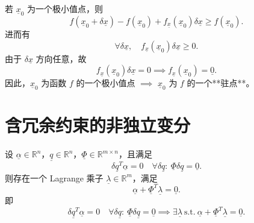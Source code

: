 若 \( \underline{x}_0 \) 为一个极小值点，则
\[
f(\underline{x}_0 + \delta \underline{x}) - f(\underline{x}_0) + f_{\underline{x}}(\underline{x}_0) \delta \underline{x} \geq f(\underline{x}_0).
\]
进而有
\[
\forall \delta \underline{x}, \quad f_{\underline{x}}(\underline{x}_0) \delta \underline{x} \geq 0.
\]
由于 \( \delta \underline{x} \) 方向任意，故
\[
f_{\underline{x}}(\underline{x}_0) \delta \underline{x} = 0 \implies f_{\underline{x}}(\underline{x}_0) = \underline{0}.
\]
因此，\( \underline{x}_0 \) 为函数 \( f \) 的一个极小值点 \( \implies \) \( \underline{x}_0 \) 为 \( f \) 的一个**驻点**。

\section{含冗余约束的非独立变分}
设 \( \underline{\alpha} \in \mathbb{R}^n \)，\( \underline{q} \in \mathbb{R}^n \)，\( \underline{\Phi} \in \mathbb{R}^{m \times n} \)，且满足
\[
\delta \underline{q}^T \underline{\alpha} = 0 \quad \forall \delta \underline{q}: \ \underline{\Phi} \delta \underline{q} = \underline{0}.
\]
则存在一个 Lagrange 乘子 \( \underline{\lambda} \in \mathbb{R}^m \)，满足
\[
\underline{\alpha} + \underline{\Phi}^T \underline{\lambda} = \underline{0}.
\]
即
\[
\delta \underline{q}^T \underline{\alpha} = 0 \quad \forall \delta \underline{q}: \ \underline{\Phi} \delta \underline{q} = \underline{0} \implies \exists \underline{\lambda} \ \text{s.t.} \ \underline{\alpha} + \underline{\Phi}^T \underline{\lambda} = \underline{0}.
\]

